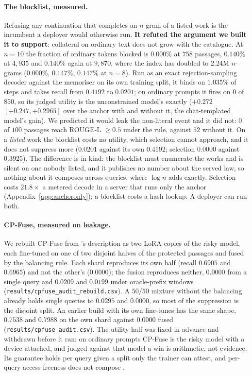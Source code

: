 \paragraph{The blocklist, measured.}\label{app:blocklist}
Refusing any continuation that completes an $n$-gram of a listed work \citep{ippolito2023preventing} is the
incumbent a deployer would otherwise run. \textbf{It refuted the argument we built it to support}: collateral
on ordinary text does not grow with the catalogue. At $n=10$ the fraction of ordinary tokens blocked is
$0.000\%$ at $758$ passages, $0.140\%$ at $4{,}935$ and $0.140\%$ again at $9{,}870$, where the index has
doubled to $2.24$M $n$-grams ($0.000\%$, $0.147\%$, $0.147\%$ at $n=8$). Run as an exact rejection-sampling
decoder against the memoriser on its own training split, it binds on $1.035\%$ of steps and takes recall
from $0.4192$ to $0.0201$; on ordinary prompts it fires on $0$ of $850$, so its judged utility is the
unconstrained model's exactly ($+0.272$ $[+0.247, +0.2965]$ over the anchor with and without it, the
chat-templated model's gain). We predicted it would leak
the non-literal event and it did not: $0$ of $100$ passages reach ROUGE-L $\ge 0.5$ under the rule, against
$52$ without it. On a \emph{listed} work the blocklist costs no utility, which selection cannot approach,
and it does not suppress more ($0.0201$ against its own $0.4192$; selection $0.0000$ against $0.3925$). The
difference is in kind: the blocklist must enumerate the works and is silent on one nobody listed, and it
publishes no number about the served law, so nothing about it composes across queries, where $\log n$ adds
exactly. Selection costs $21.8\times$ a metered decode in a server that runs only the anchor
(Appendix~\ref{app:anchoronly}); a blocklist costs a hash lookup. A deployer can run both.

\paragraph{CP-Fuse, measured on leakage.}\label{app:cpfuse}
We rebuilt CP-Fuse from \citet{abad2025cpfuse}'s description as two LoRA copies of the
risky model, each fine-tuned on one of two disjoint halves of the protected passages and fused by the
balancing rule. Each shard reproduces its own half (recall $0.6905$ and $0.6965$) and not the other's
($0.0000$); the fusion reproduces neither, $0.0000$ from a single query and $0.0209$ and $0.0199$ under
oracle-prefix windows (\texttt{results/\allowbreak cpfuse\_\allowbreak audit\_\allowbreak rebuild.csv}). A
$50/50$ mixture without the balancing already holds single queries to $0.0295$ and $0.0000$, so most of the
suppression is the disjoint split. An earlier build with its own fine-tunes has the same shape,
$0.7538$ and $0.7988$ on the own shard against $0.0000$ fused
(\texttt{results/\allowbreak cpfuse\_\allowbreak audit.csv}). The utility half was fixed in advance and withdrawn before it ran: on
ordinary prompts CP-Fuse is the risky model with a device attached, and judged against that model a win is
arithmetic, not evidence. Its guarantee holds per query given a split only the trainer can attest, and
per-query access-freeness does not compose \citep{cohen2025blameless}.


